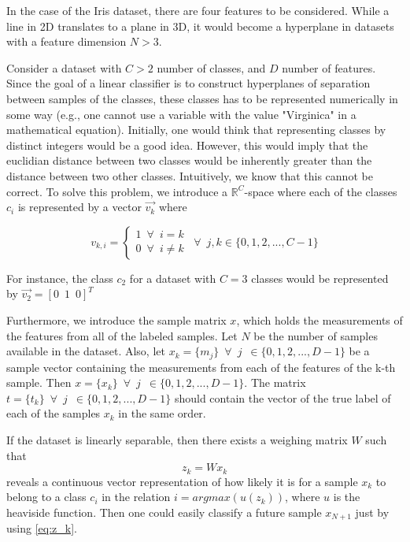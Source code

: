 \documentclass{article}
\begin{document}
In the case of the Iris dataset, there are four features to be considered. While a line in 2D
translates to a plane in 3D, it would become a hyperplane in datasets with a feature dimension
$N > 3$.

Consider a dataset with $C > 2$ number of classes, and $D$ number of features. Since the goal of
a linear classifier is to construct hyperplanes of separation between samples of the classes,
these classes has to be represented numerically in some way (e.g., one cannot use a variable
with the value "Virginica" in a mathematical equation). Initially, one would think that
representing classes by distinct integers would be a good idea. However, this would imply
that the euclidian distance between two classes would be inherently greater than the distance
between two other classes. Intuitively, we know that this cannot be correct. To solve this problem,
we introduce a $\mathbb{R}^C$-space where each of the classes $c_i$ is represented by a vector $\vec{v_k}$ where

\begin{equation}
    v_{k,i} = \begin{cases}
        1 \enspace \forall \enspace i = k \\
        0 \enspace \forall \enspace i \neq k
    \end{cases} \enspace \forall \enspace j,k \in \{0, 1, 2, ..., C - 1\}\label{eq:class_vector}
\end{equation}

For instance, the class $c_2$ for a dataset with $C=3$ classes would be represented by
$\vec{v_2} = [ 0\enspace 1\enspace  0 ]^T$

Furthermore, we introduce the sample matrix $x$, which holds the measurements of the features from
all of the labeled samples. Let $N$ be the number of samples available in the dataset. Also,
let $x_k = \{m_j\} \enspace \forall \enspace j \enspace \in \{0, 1, 2, ..., D - 1\}$ be a sample vector containing
the measurements from each of the features of the k-th sample. Then $x = \{x_k\} \enspace \forall \enspace j \enspace
\in \{0, 1, 2, ..., D - 1\}$. The matrix $t = \{t_k\} \enspace \forall \enspace j \enspace
\in \{0, 1, 2, ..., D - 1\}$ should contain the vector of the true label of each of the samples
$x_k$ in the same order.

If the dataset is linearly separable, then there exists a weighing matrix $W$ such that
\begin{equation}
    z_k = Wx_k \label{eq:z_k}
\end{equation}
reveals a continuous vector representation of how likely it is for a sample $x_k$ to belong to a class
$c_i$ in the relation $i = argmax(u(z_k))$, where $u$ is the heaviside function. Then one could
easily classify a future sample $x_{N+1}$ just by using \eqref{eq:z_k}.
\end{document}
